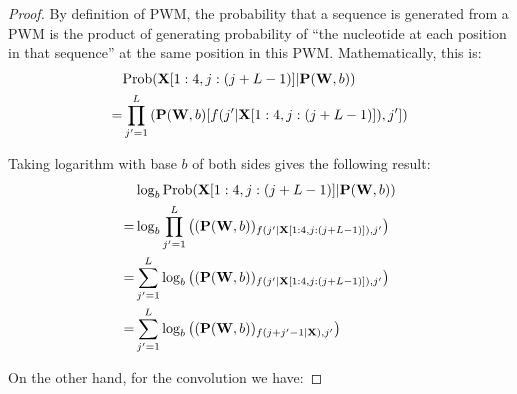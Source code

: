 \documentclass[12pt]{article}
\newcommand{\matrixSymbol}[1]{\mathbf{#1}}
\begin{document}
\begin{proof}
By definition of PWM, the probability that a sequence is generated from a PWM is the product of generating probability of ``the nucleotide at each position in that sequence'' at the same position in this PWM. Mathematically, this is:
\begin{align}
  & \mathrm{Prob}(\matrixSymbol{X}[1:4, j:(j+L-1)]|\matrixSymbol{P}(\matrixSymbol{W}, b)) \notag \\
= & \prod_{j'=1}^{L}{\left( \matrixSymbol{P}(\matrixSymbol{W}, b)[f(j'|\matrixSymbol{X}[1:4, j:(j+L-1)]), j']\right)}
\end{align}

Taking logarithm with base $b$ of both sides gives the following result:
\begin{align} 
  & \log_{b}{\mathrm{Prob}(\matrixSymbol{X}[1:4, j:(j+L-1)]|\matrixSymbol{P}(\matrixSymbol{W}, b))} \notag \\
= &  \log_{b}{\prod_{j'=1}^{L}{\left( (\matrixSymbol{P}(\matrixSymbol{W}, b))_{f(j'|\matrixSymbol{X}[1:4, j:(j+L-1)]), j'}\right)}} \\
= & \sum_{j'=1}^{L}{\log_{b}{\left( (\matrixSymbol{P}(\matrixSymbol{W}, b))_{f(j'|\matrixSymbol{X}[1:4, j:(j+L-1)]), j'}\right)}} \notag \\
= & \sum_{j'=1}^{L}{\log_{b}{\left( (\matrixSymbol{P}(\matrixSymbol{W}, b))_{f(j + j' - 1|\matrixSymbol{X}), j'}\right)}} \notag
\end{align}

On the other hand, for the convolution we have:


\end{proof}
\end{document}
